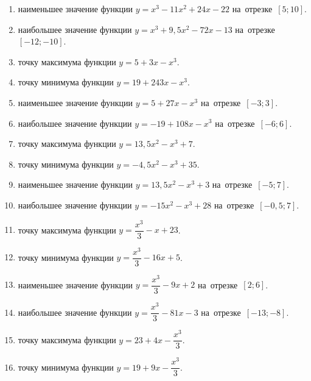 \documentclass[a4paper,10pt]{article}
\begin{document}
\begin{enumerate}
\item {} наименьшее значение функции $y=x^3 -11x^2+24x-22$ на~отрезке~$\left[5;10\right]$.

\item {} наибольшее значение функции $y=x^3 +9,5x^2-72x-13$ на~отрезке~$\left[-12;-10\right]$.

\item {} точку максимума функции $y=5+3x-x^3$.

\item {} точку минимума функции $y=19+243x-x^3$.

\item {} наименьшее значение функции $y=5+27x-x^3$ на~отрезке~$\left[-3;3\right]$.

\item {} наибольшее значение функции $y=-19+108x-x^3$ на~отрезке~$\left[-6;6\right]$.

\item {} точку максимума функции $y=13,5x^2-x^3+7$.

\item {} точку минимума функции $y=-4,5x^2-x^3+35$.

\item {} наименьшее значение функции $y=13,5x^2-x^3+3$ на~отрезке~$\left[-5;7\right]$.

\item {} наибольшее значение функции $y=-15x^2-x^3+28$ на~отрезке~$\left[-0,5;7\right]$.

\item {} точку максимума функции $y=\dfrac{x^3}{3} -x+23$.

\item {} точку минимума функции $y=\dfrac{x^3}{3} -16x+5$.

\item {} наименьшее значение функции $y=\dfrac{x^3}{3} -9x+2$ на~отрезке~$\left[2;6\right]$.

\item {} наибольшее значение функции $y=\dfrac{x^3}{3} -81x-3$ на~отрезке~$\left[-13;-8\right]$.

\item {} точку максимума функции $y=23 +4x-\dfrac{x^3}{3}$.

\item {} точку минимума функции $y=19 +9x-\dfrac{x^3}{3}$.


\end{enumerate}
\end{document}
